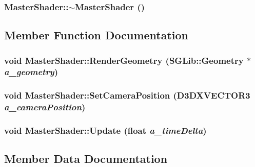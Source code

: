 \subsubsection[{$\sim$MasterShader}]{\setlength{\rightskip}{0pt plus 5cm}MasterShader::$\sim$MasterShader ()\hspace{0.3cm}{\ttfamily  [inline]}}\label{class_master_shader_af92e2ec718026698de2edcfc4c20948c}


\subsection{Member Function Documentation}
\subsubsection[{RenderGeometry}]{\setlength{\rightskip}{0pt plus 5cm}void MasterShader::RenderGeometry (SGLib::Geometry $\ast$ {\em a\_\-geometry})\hspace{0.3cm}{\ttfamily  [inline]}}\label{class_master_shader_a5fc7f7834ff6938c2b55d6af5c97766d}
\subsubsection[{SetCameraPosition}]{\setlength{\rightskip}{0pt plus 5cm}void MasterShader::SetCameraPosition (D3DXVECTOR3 {\em a\_\-cameraPosition})\hspace{0.3cm}{\ttfamily  [inline]}}\label{class_master_shader_af1125d20e6425a5694700a08ae061d3e}
\subsubsection[{Update}]{\setlength{\rightskip}{0pt plus 5cm}void MasterShader::Update (float {\em a\_\-timeDelta})\hspace{0.3cm}{\ttfamily  [inline]}}\label{class_master_shader_acf8849db1f0ac43c2d35bf714ef285ed}


\subsection{Member Data Documentation}
